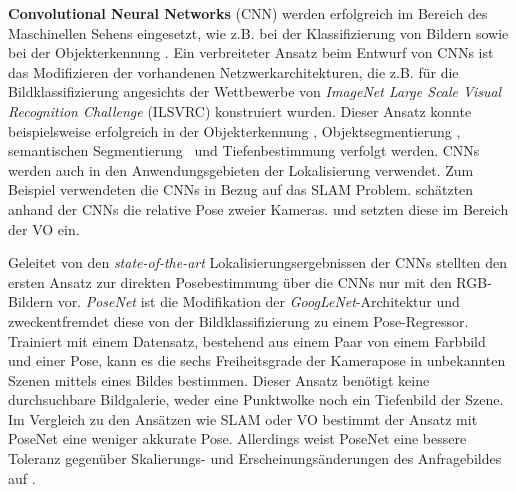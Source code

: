 \textbf{Convolutional Neural Networks} (CNN) werden erfolgreich im Bereich des Maschinellen Sehens eingesetzt, wie z.B. bei der Klassifizierung von Bildern \cite{krizhevskyImageNetClassificationDeep2012} sowie bei der Objekterkennung \cite{girshickRichFeatureHierarchies2014}. 
Ein verbreiteter Ansatz beim Entwurf von CNNs ist das Modifizieren der vorhandenen Netzwerkarchitekturen, die z.B. für die Bildklassifizierung angesichts der Wettbewerbe von \textit{ImageNet Large Scale Visual Recognition Challenge} (ILSVRC) \cite{russakovskyImageNetLargeScale2015} konstruiert wurden. Dieser Ansatz konnte beispielsweise erfolgreich in der Objekterkennung \cite{girshickFastRCNN2015a}, Objektsegmentierung \cite{kokkinosPushingBoundariesBoundary2015}, semantischen Segmentierung \cite{ hazirbasFuseNetIncorporatingDepth2017} und Tiefenbestimmung \cite{boliDepthSurfaceNormal2015} verfolgt werden. CNNs werden auch in den Anwendungsgebieten der Lokalisierung verwendet. Zum Beispiel verwendeten \citet{parisottoGlobalPoseEstimation2018} die CNNs in Bezug auf das SLAM Problem. \citet{melekhovRelativeCameraPose2017} schätzten anhand der CNNs die relative Pose zweier Kameras. \citet{costanteExploringRepresentationLearning2016} und \citet{wangDeepVOEndtoendVisual2017} setzten diese im Bereich der VO ein.

Geleitet von den \textit{state-of-the-art} Lokalisierungsergebnissen der CNNs stellten \citet{kendallPoseNetConvolutionalNetwork2015} den ersten Ansatz zur direkten Posebestimmung über die CNNs nur mit den RGB-Bildern vor. \textit{PoseNet} ist die Modifikation der \textit{GoogLeNet}-Architektur \cite{szegedyGoingDeeperConvolutions2015} und zweckentfremdet diese von der Bildklassifizierung zu einem Pose-Regressor. Trainiert mit einem Datensatz, bestehend aus einem Paar von einem Farbbild und einer Pose, kann es die sechs Freiheitsgrade der Kamerapose in unbekannten Szenen mittels eines Bildes bestimmen. Dieser Ansatz benötigt keine durchsuchbare Bildgalerie, weder eine Punktwolke noch ein Tiefenbild der Szene. Im Vergleich zu den Ansätzen wie SLAM oder VO bestimmt der Ansatz mit PoseNet eine weniger akkurate Pose. Allerdings weist PoseNet eine bessere Toleranz gegenüber Skalierungs- und Erscheinungsänderungen des Anfragebildes auf \cite{piascoSurveyVisualBasedLocalization2018}.

